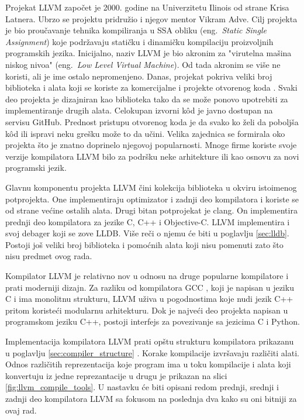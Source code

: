 \documentclass[12pt,oneside]{memoir}
\begin{document}
Projekat LLVM započet je 2000. godine na Univerzitetu Ilinois od strane Krisa Latnera. Ubrzo se projektu pridružio i njegov mentor Vikram Adve.
Cilj projekta je bio proučavanje tehnika kompiliranja u SSA obliku (eng.~{\em Static Single Assignment}) koje podržavaju statičku i dinamičku kompilaciju proizvoljnih programskih jezika.
Inicijalno, naziv LLVM je bio akronim za "virutelna mašina niskog nivoa" (eng.~{\em Low Level Virtual Machine}).
Od tada akronim se više ne koristi, ali je ime ostalo nepromenjeno.
Danas, projekat pokriva veliki broj biblioteka i alata koji se koriste za komercijalne i projekte otvorenog koda \cite{llvm}.
Svaki deo projekta je dizajniran kao biblioteka tako da se može ponovo upotrebiti za implementiranje drugih alata.
Celokupan izvorni k\^od je javno dostupan na servisu GitHub. %
Prednost pristupu otvorenog koda je da svako ko želi da poboljša k\^od ili ispravi neku grešku može to da učini.
Velika zajednica se formirala oko projekta što je znatno doprinelo njegovoj popularnosti.
Mnoge firme koriste svoje verzije kompilatora LLVM bilo za podršku neke arhitekture ili kao osnovu za novi programski jezik. %

Glavnu komponentu projekta LLVM čini kolekcija biblioteka u okviru istoimenog potprojekta.
One implementiraju optimizator i zadnji deo kompilatora i koriste se od strane većine ostalih alata.
Drugi bitan potprojekat je clang. On implementira prednji deo kompilatora za jezike C, C++ i Objective-C.
LLVM implementira i svoj debager koji se zove LLDB. Više reči o njemu će biti u poglavlju \ref{sec:lldb}.
Postoji još veliki broj biblioteka i pomoćnih alata koji nisu pomenuti zato što nisu predmet ovog rada.

Kompilator LLVM je relativno nov u odnosu na druge popularne kompilatore i prati moderniji dizajn.
Za razliku od kompilatora GCC \cite{gcc}, koji je napisan u jeziku C i ima monolitnu strukturu, LLVM uživa u pogodnostima koje nudi jezik C++ pritom koristeći modularnu arhitekturu.
Dok je najveći deo projekta napisan u programskom jeziku C++, postoji interfejs za povezivanje sa jezicima C i Python.

Implementacija kompilatora LLVM prati opštu strukturu kompilatora prikazanu u poglavlju \ref{sec:compiler_structure} \cite{brown2011architecture}.
Korake kompilacije izvršavaju različiti alati.
Odnos različitih reprezentacija koje program ima u toku kompilacije i alata koji konvertuju iz jedne reprezantacije u drugu je prikazan na slici \ref{fig:llvm_compile_tools}.
U nastavku će biti opisani redom prednji, srednji i zadnji deo kompilatora LLVM sa fokusom na poslednja dva kako su oni bitniji za ovaj rad.
\end{document}
